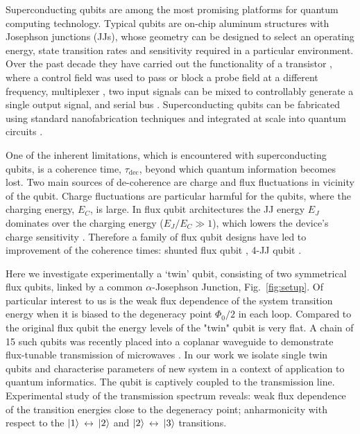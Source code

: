 \documentclass[%
reprint,
superscriptaddress,
bibnotes,
amsmath,
amssymb,
aps,
showkeys,
prb,
]{revtex4-1}
\newcommand{\iket}[1]{\ensuremath{\Ket{#1}}}
\newcommand{\ilra}{\ensuremath{\,\leftrightarrow\,}}
\begin{document}
Superconducting  qubits  are  among  the most  promising  platforms  for  quantum  computing
technology. Typical  qubits are  on-chip aluminum structures  with Josephson  junctions (JJs),
whose geometry  can be  designed to  select an  operating energy,  state transition  rates and
sensitivity required in a particular environment.  Over  the past decade they have carried out
the   functionality   of   a   transistor   \cite{Astafiev_2010,   Hoi_2011,   Abdumalikov_2010,
  Astafiev_2010_2},  where a  control field  was used  to pass or block a  probe field  at a
different  frequency,  multiplexer  \cite{H_nigl_Decrinis_2018},  two  input signals  can  be  mixed  to
controllably generate a single output signal, and serial bus \cite{Shen_2005}.  Superconducting
qubits can  be fabricated using  standard nanofabrication  techniques and integrated  at scale
into quantum circuits \cite{Johnson_2010}.

One  of the  inherent limitations,  which  is encountered with superconducting qubits, is  a coherence  time,
$\tau_{\text{dec}}$, beyond  which quantum information  becomes lost. Two main sources of de-coherence are charge and flux fluctuations in vicinity of the qubit. Charge fluctuations are particular harmful for the qubits, where the charging energy, $E_C$, is large. In  flux qubit
architectures the JJ  energy $E_J$ dominates over  the charging energy  ($E_J/E_C \gg 1$),
which lowers  the device's  charge sensitivity  \cite{Orlando_1999,Chiorescu_2003,Mooij_1999}. Therefore a
family  of flux qubit designs  have led to  improvement of the coherence  times: shunted
flux qubit \cite{Yan_2016} , 4-JJ qubit \cite{Qiu_2016,Pop_2014}.


Here we investigate experimentally a `twin'  qubit, consisting of two symmetrical flux qubits,
linked by a common $ \alpha$-Josephson Junction, Fig.~\ref{fig:setup}.  Of particular interest to us is the weak flux dependence of the
system transition  energy when  it is  biased to the  degeneracy point  $\Phi_0/2 $ in each loop. Compared to the original flux qubit the energy levels of the "twin" qubit is very flat. A chain of 15 such qubits
was recently  placed into  a coplanar  waveguide to  demonstrate flux-tunable  transmission of
microwaves \cite{Shulga_2018}. In our work we  isolate single twin qubits and characterise parameters of new system in a context of application to quantum informatics.
The qubit is captively coupled to the  transmission line. Experimental study of the transmission spectrum reveals: weak flux
dependence  of the  transition  energies close  to  the degeneracy  point;
anharmonicity with respect  to the  \iket{1}\ilra\iket{2} and  \iket{2}\ilra\iket{3} transitions.
\end{document}
